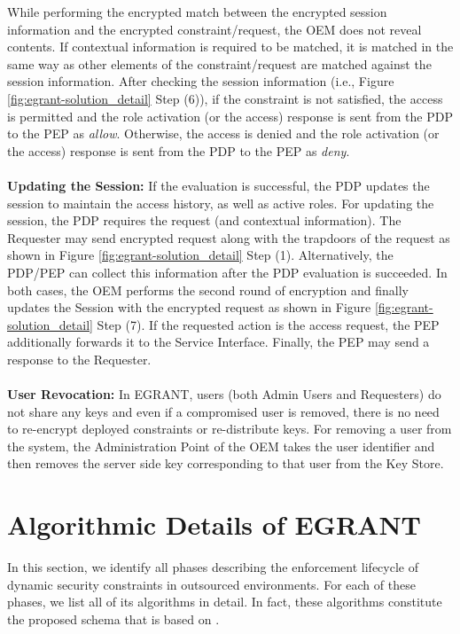 \documentclass[epsfig,a4paper,11pt,titlepage]{book}
\numberwithin{algorithm}{chapter}
\begin{document}
While performing the encrypted match between the encrypted session information and the encrypted constraint/request, the \gls{OEM} does not reveal contents. If contextual information is required to be matched, it is matched in the same way as other elements of the constraint/request are matched against the session information. After checking the session information (i.e., Figure \ref{fig:egrant-solution_detail} Step (6)), if the constraint is not satisfied, the access is permitted and the role activation (or the access) response is sent from the \gls{PDP} to the \gls{PEP} as \emph{allow}. Otherwise, the access is denied and the role activation (or the access) response is sent from the \gls{PDP} to the \gls{PEP} as \emph{deny}. \\ \\
\noindent \textbf{Updating the Session:} If the evaluation is successful, the \gls{PDP} updates the session to maintain the access history, as well as active roles. For updating the session, the \gls{PDP} requires the request (and contextual information). The Requester may send encrypted request along with the trapdoors of the request as shown in Figure \ref{fig:egrant-solution_detail} Step (1). Alternatively, the \gls{PDP}/\gls{PEP} can collect this information after the \gls{PDP} evaluation is succeeded. In both cases, the \gls{OEM} performs the second round of encryption and finally updates the Session with the encrypted request as shown in Figure \ref{fig:egrant-solution_detail} Step (7). If the requested action is the access request, the \gls{PEP} additionally forwards it to the Service Interface. Finally, the \gls{PEP} may send a response to the Requester. \\ \\
\noindent \textbf{User Revocation:} In \gls{EGRANT}, users (both Admin Users and Requesters) do not share any keys and even if a compromised user is removed, there is no need to re-encrypt deployed constraints or re-distribute keys. For removing a user from the system, the Administration Point of the \gls{OEM} takes the user identifier and then removes the server side key corresponding to that user from the Key Store.


\section[Algorithmic Details of E-GRANT]{Algorithmic Details of \gls{EGRANT}}
\label{sec:egrant-algorithmic-details}
In this section, we identify all phases describing the enforcement lifecycle of dynamic security constraints in outsourced environments. For each of these phases, we list all of its algorithms in detail. In fact, these algorithms constitute the proposed schema that is based on \cite{Dong:2011}.
\end{document}
